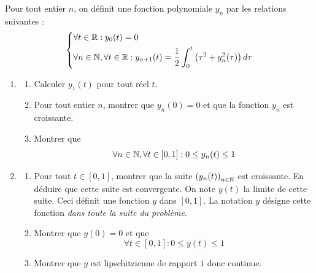 Pour tout entier $n$, on définit une fonction polynomiale $y_n$ par les relations suivantes :
\begin{displaymath}
 \left\lbrace 
\begin{aligned}
&\forall t \in \mathbb{R} : y_0(t) = 0 \\ 
&\forall n\in \mathbb{N} , \forall t\in \mathbb{R} : y_{n+1}(t) = \frac{1}{2}\int_0^t\left(\tau^2 + y_n^2(\tau)\right)d\tau 
\end{aligned}
\right. 
\end{displaymath}
\begin{enumerate}
 \item \begin{enumerate}
 \item Calculer $y_1(t)$ pour tout réel $t$. 
\item Pour tout entier $n$, montrer que $y_n(0)=0$  et que la fonction $y_n$ est croissante. 
\item Montrer que 
\begin{displaymath}
 \forall n\in \mathbb{N} , \forall t\in [0,1] : 0\leq y_n(t) \leq 1
\end{displaymath}
\end{enumerate}

\item \begin{enumerate}
 \item Pour tout $t\in[0,1]$, montrer que la suite $\left(y_n(t) \right)_{n\in\mathbb{N}}$ est croissante. En déduire que cette suite est convergente. On note $y(t)$ la limite de cette suite.\newline
Ceci définit une fonction $y$ dans $[0,1]$. La notation $y$ désigne cette fonction \emph{dans toute la suite du problème}.
\item Montrer que $y(0)=0$ et que 
\begin{displaymath}
 \forall t\in [0,1] : 0\leq y(t) \leq 1
\end{displaymath}
\item Montrer que $y$ est lipschitzienne de rapport $1$ donc continue.
\end{enumerate}


\end{enumerate}
